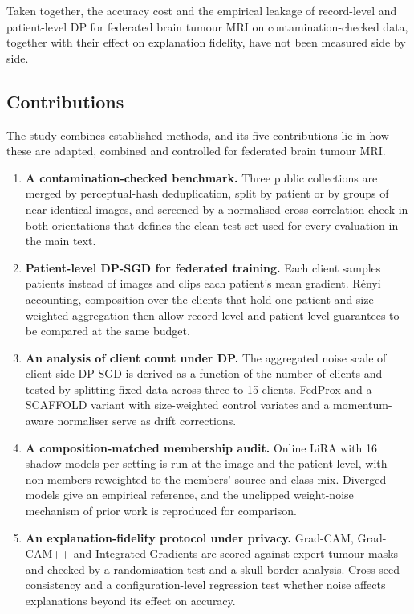\documentclass[preprint,12pt]{elsarticle}
\begin{document}
Taken together, the accuracy cost and the empirical leakage of record-level and patient-level DP for federated brain
tumour MRI on contamination-checked data, together with their effect on explanation fidelity, have not been measured
side by side.

\subsection{Contributions}
The study combines established methods, and its five contributions lie in how these are adapted, combined and
controlled for federated brain tumour MRI.
\begin{enumerate}
\item \textbf{A contamination-checked benchmark.} Three public collections are merged by perceptual-hash
deduplication, split by patient or by groups of near-identical images, and screened by a normalised cross-correlation
check in both orientations that defines the clean test set used for every evaluation in the main text.
\item \textbf{Patient-level DP-SGD for federated training.} Each client samples patients instead of images and clips
each patient's mean gradient. R\'enyi accounting, composition over the clients that hold one patient and size-weighted
aggregation then allow record-level and patient-level guarantees to be compared at the same budget.
\item \textbf{An analysis of client count under DP.} The aggregated noise scale of client-side DP-SGD is derived as a
function of the number of clients and tested by splitting fixed data across three to 15 clients. FedProx and a
SCAFFOLD variant with size-weighted control variates and a momentum-aware normaliser serve as drift corrections.
\item \textbf{A composition-matched membership audit.} Online LiRA with 16 shadow models per setting is run at the
image and the patient level, with non-members reweighted to the members' source and class mix. Diverged models give an
empirical reference, and the unclipped weight-noise mechanism of prior work is reproduced for comparison.
\item \textbf{An explanation-fidelity protocol under privacy.} Grad-CAM, Grad-CAM++ and Integrated Gradients are
scored against expert tumour masks and checked by a randomisation test and a skull-border analysis. Cross-seed
consistency and a configuration-level regression test whether noise affects explanations beyond its effect on
accuracy.
\end{enumerate}
\end{document}
